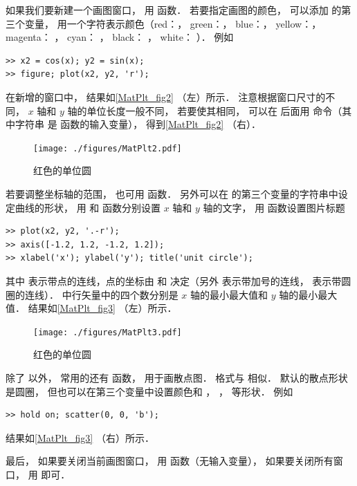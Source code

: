 如果我们要新建一个画图窗口， 用  函数． 若要指定画图的颜色， 可以添加  的第三个变量， 用一个字符表示颜色（red：， green：， blue：， yellow：， magenta： ， cyan： ， black： ， white： ）． 例如
\begin{lstlisting}[language=plain]
>> x2 = cos(x); y2 = sin(x);
>> figure; plot(x2, y2, 'r');
\end{lstlisting}
在新增的窗口中， 结果如\autoref{MatPlt_fig2} （左）所示． 注意根据窗口尺寸的不同， $x$ 轴和 $y$ 轴的单位长度一般不同， 若要使其相同， 可以在  后面用  命令（其中字符串  是  函数的输入变量）， 得到\autoref{MatPlt_fig2} （右）．
\begin{figure}[ht]
\centering
\texttt{[image: ./figures/MatPlt2.pdf]}
\caption{红色的单位圆} \label{MatPlt_fig2}
\end{figure}
若要调整坐标轴的范围， 也可用  函数． 另外可以在  的第三个变量的字符串中设定曲线的形状， 用  和  函数分别设置 $x$ 轴和 $y$ 轴的文字， 用  函数设置图片标题
\begin{lstlisting}[language=plain]
>> plot(x2, y2, '.-r');
>> axis([-1.2, 1.2, -1.2, 1.2]);
>> xlabel('x'); ylabel('y'); title('unit circle');
\end{lstlisting}
其中 表示带点的连线，点的坐标由  和  决定（另外  表示带加号的连线，  表示带圆圈的连线）．  中行矢量中的四个数分别是 $x$ 轴的最小最大值和 $y$ 轴的最小最大值． 结果如\autoref{MatPlt_fig3} （左）所示．
\begin{figure}[ht]
\centering
\texttt{[image: ./figures/MatPlt3.pdf]}
\caption{红色的单位圆} \label{MatPlt_fig3}
\end{figure}

除了  以外， 常用的还有  函数， 用于画散点图． 格式与  相似． 默认的散点形状是圆圈， 但也可以在第三个变量中设置颜色和 ， ，  等形状． 例如
\begin{lstlisting}[language=plain]
>> hold on; scatter(0, 0, 'b');
\end{lstlisting}
结果如\autoref{MatPlt_fig3} （右）所示．

最后， 如果要关闭当前画图窗口， 用  函数（无输入变量）， 如果要关闭所有窗口， 用  即可．